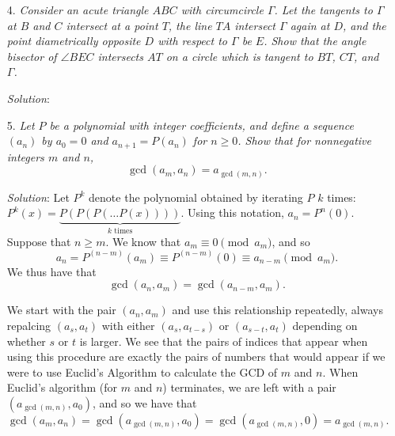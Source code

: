 \documentclass{article}
\begin{document}
\begin{enumerate}
\item[4.] %
{\itshape
Consider an acute triangle $ABC$ with circumcircle $\Gamma$.
Let the tangents to $\Gamma$ at $B$ and $C$ intersect at a point $T$, the line $TA$ intersect $\Gamma$ again at $D$, and the point diametrically opposite $D$ with respect to $\Gamma$ be $E$.
Show that the angle bisector of $\angle BEC$ intersects $AT$ on a circle which is tangent to $BT$, $CT$, and $\Gamma$.
}

\textit{Solution}:


\item[5.] %
{\itshape
Let $P$ be a polynomial with integer coefficients, and define a sequence $(a_n)$ by $a_0 = 0$ and $a_{n+1} = P(a_n)$ for $n \geq 0$.
Show that for nonnegative integers $m$ and $n$,
\[ \gcd(a_m,a_n) = a_{\gcd(m,n)}. \]
}

\textit{Solution}:
Let $P^k$ denote the polynomial obtained by iterating $P$ $k$ times: $P^k(x) = \underbrace{P(P(P( \dots P(x))))}_{k \text{ times}}$. Using this notation, $a_n = P^n (0)$.
Suppose that $n \geq m$. We know that $a_m \equiv 0 \pmod{a_m}$, and so
\[
	a_n = P^{(n - m)} (a_m) \equiv P^{(n - m)} (0) \equiv a_{n - m} \pmod{a_m}.
\]
We thus have that
\[
	\gcd(a_n, a_m) = \gcd(a_{n - m}, a_m).
\]

We start with the pair $(a_n, a_m)$ and use this relationship repeatedly, always repalcing $(a_s, a_t)$ with either $(a_s, a_{t - s})$ or $(a_{s - t}, a_t)$ depending on whether $s$ or $t$ is larger. We see that the pairs of indices that appear when using this procedure are exactly the pairs of numbers that would appear if we were to use Euclid's Algorithm to calculate the GCD of $m$ and $n$. When Euclid's algorithm (for $m$ and $n$) terminates, we are left with a pair $(a_{\gcd(m, n)}, a_0)$, and so we have that
\[
	\gcd(a_m, a_n) = \gcd(a_{\gcd(m, n)}, a_0) = \gcd(a_{\gcd(m, n)}, 0) = a_{\gcd(m, n)}.
\]


\end{enumerate}
\end{document}
